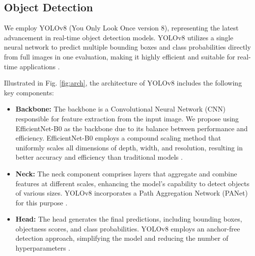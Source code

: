 \documentclass{article} %
\begin{document}
\subsection{Object Detection}
We employ YOLOv8 (You Only Look Once version 8), representing the latest advancement in real-time object detection models. YOLOv8 utilizes a single neural network to predict multiple bounding boxes and class probabilities directly from full images in one evaluation, making it highly efficient and suitable for real-time applications \citep{Jocher_Ultralytics_YOLO_2023}.

Illustrated in Fig. \ref{fig:arch}, the architecture of YOLOv8 includes the following key components:
\begin{itemize}
    \item \textbf{Backbone:} The backbone is a Convolutional Neural Network (CNN) responsible for feature extraction from the input image. We propose using EfficientNet-B0 as the backbone due to its balance between performance and efficiency. EfficientNet-B0 employs a compound scaling method that uniformly scales all dimensions of depth, width, and resolution, resulting in better accuracy and efficiency than traditional models \citep{tan2020efficientnet}.
    \item \textbf{Neck:} The neck component comprises layers that aggregate and combine features at different scales, enhancing the model's capability to detect objects of various sizes. YOLOv8 incorporates a Path Aggregation Network (PANet) for this purpose \citep{Jocher_Ultralytics_YOLO_2023}.
    \item \textbf{Head:} The head generates the final predictions, including bounding boxes, objectness scores, and class probabilities. YOLOv8 employs an anchor-free detection approach, simplifying the model and reducing the number of hyperparameters \citep{Jocher_Ultralytics_YOLO_2023}.
\end{itemize}
\end{document}
